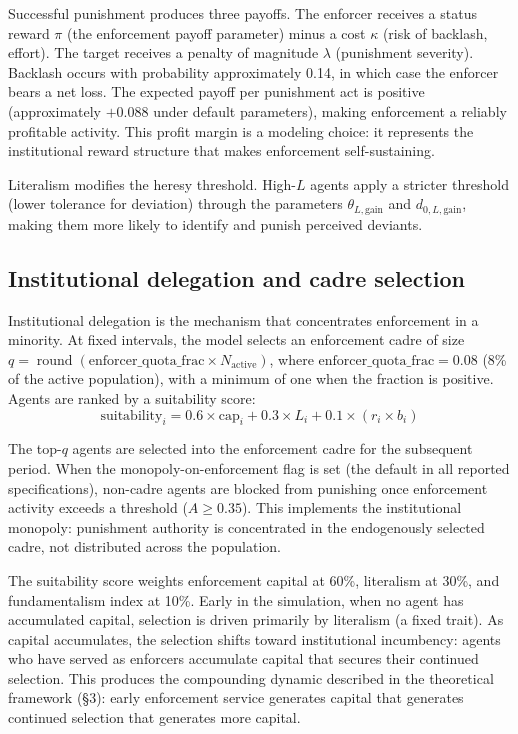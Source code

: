 \documentclass[12pt]{article}
\begin{document}
Successful punishment produces three payoffs. The enforcer receives a status reward $\pi$ (the enforcement payoff parameter) minus a cost $\kappa$ (risk of backlash, effort). The target receives a penalty of magnitude $\lambda$ (punishment severity). Backlash occurs with probability approximately 0.14, in which case the enforcer bears a net loss. The expected payoff per punishment act is positive (approximately $+0.088$ under default parameters), making enforcement a reliably profitable activity. This profit margin is a modeling choice: it represents the institutional reward structure that makes enforcement self-sustaining.

Literalism modifies the heresy threshold. High-$L$ agents apply a stricter threshold (lower tolerance for deviation) through the parameters $\theta_{L,\text{gain}}$ and $d_{0,L,\text{gain}}$, making them more likely to identify and punish perceived deviants.

\subsection{Institutional delegation and cadre selection}

Institutional delegation is the mechanism that concentrates enforcement in a minority. At fixed intervals, the model selects an enforcement cadre of size $q = \operatorname{round}(\text{enforcer\_quota\_frac} \times N_{\text{active}})$, where $\text{enforcer\_quota\_frac} = 0.08$ (8\% of the active population), with a minimum of one when the fraction is positive. Agents are ranked by a suitability score:
\[
\text{suitability}_i = 0.6 \times \text{cap}_i + 0.3 \times L_i + 0.1 \times (r_i \times b_i)
\]

The top-$q$ agents are selected into the enforcement cadre for the subsequent period. When the monopoly-on-enforcement flag is set (the default in all reported specifications), non-cadre agents are blocked from punishing once enforcement activity exceeds a threshold ($A \geq 0.35$). This implements the institutional monopoly: punishment authority is concentrated in the endogenously selected cadre, not distributed across the population.

The suitability score weights enforcement capital at 60\%, literalism at 30\%, and fundamentalism index at 10\%. Early in the simulation, when no agent has accumulated capital, selection is driven primarily by literalism (a fixed trait). As capital accumulates, the selection shifts toward institutional incumbency: agents who have served as enforcers accumulate capital that secures their continued selection. This produces the compounding dynamic described in the theoretical framework (\S3): early enforcement service generates capital that generates continued selection that generates more capital.
\end{document}
